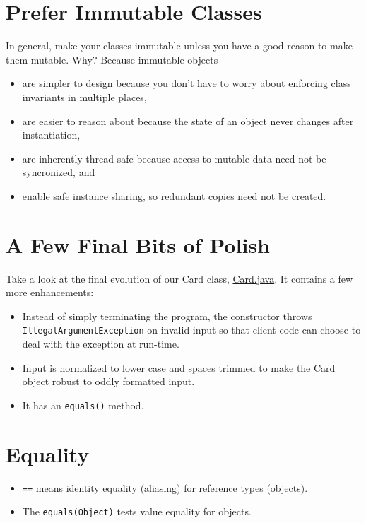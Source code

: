 \documentclass{article}
\begin{document}
\section{Prefer Immutable Classes}


In general, make your classes immutable unless you have a good reason to make them mutable.  Why?  Because immutable objects
\begin{itemize}
\item are simpler to design because you don't have to worry about enforcing class invariants in multiple places,
\item are easier to reason about because the state of an object never changes after instantiation,
\item are inherently thread-safe because access to mutable data need not be syncronized, and
\item enable safe instance sharing, so redundant copies need not be created.
\end{itemize}





\section{A Few Final Bits of Polish}


Take a look at the final evolution of our Card class, \href{https://github.com/cs1331/cs1331.github.io/blob/master/code/classes/Card.java}{Card.java}.  It contains a few more enhancements:
\begin{itemize}
\item Instead of simply terminating the program, the constructor throws {\tt IllegalArgumentException} on invalid input so that client code can choose to deal with the exception at run-time.
\item Input is normalized to lower case and spaces trimmed to make the Card object robust to oddly formatted input.
\item It has an {\tt equals()} method.
\end{itemize}






\section{Equality}

\begin{itemize}
\item {\tt ==} means identity equality (aliasing) for reference types (objects).
\item The {\tt equals(Object)} tests value equality for objects.
\end{itemize}
\end{document}
